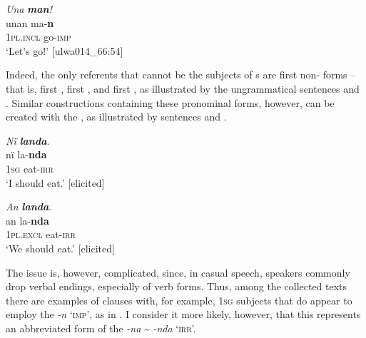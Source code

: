 \ea%
    \label{ex:syntax:80}
          \textit{Una} \textbf{\textit{man}}\textit{!}\\
\gll    unan    ma-\textbf{n}\\
    1\textsc{pl.incl}  go-\textsc{imp}\\
\glt `Let’s go!’ [ulwa014\_66:54]
\z

Indeed, the only referents that cannot be the subjects of s are first  non- forms -- that is, first  , first   , and first   , as illustrated by the ungrammatical sentences  and . Similar constructions containing these pronominal forms, however, can be created with the  , as illustrated by sentences  and .

\z

\z

\ea%
    \label{ex:syntax:83}
          \textit{Nï} \textbf{\textit{landa}}.\\
\gll nï    la-\textbf{nda}\\
    \textsc{1sg}  eat-\textsc{irr}\\
\glt `I should eat.’ [elicited]
\z

\ea%
    \label{ex:syntax:84}
          \textit{An} \textbf{\textit{landa}}.\\
\gll an      la-\textbf{nda}\\
    \textsc{1pl.excl}  eat-\textsc{irr}\\
\glt `We should eat.’ [elicited]
\z

The issue is, however, complicated, since, in casual speech, speakers commonly drop verbal endings, especially of  verb forms. Thus, among the collected texts there are examples of  clauses with, for example, 1\textsc{sg} subjects that do appear to employ the   \textit{-n} `\textsc{imp}’, as in . I consider it more likely, however, that this   represents an abbreviated form of the   \textit{-na} {\textasciitilde} \textit{-nda} `\textsc{irr}’.

